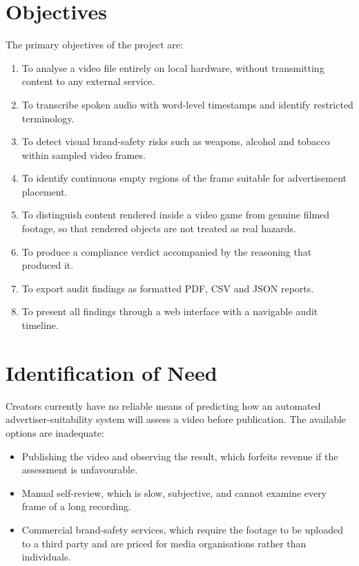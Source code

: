 \documentclass[12pt,a4paper,twoside]{report}
\begin{document}
\section{Objectives}

The primary objectives of the project are:

\begin{enumerate}
\item To analyse a video file entirely on local hardware, without transmitting content to any external service.
\item To transcribe spoken audio with word-level timestamps and identify restricted terminology.
\item To detect visual brand-safety risks such as weapons, alcohol and tobacco within sampled video frames.
\item To identify continuous empty regions of the frame suitable for advertisement placement.
\item To distinguish content rendered inside a video game from genuine filmed footage, so that rendered objects are not treated as real hazards.
\item To produce a compliance verdict accompanied by the reasoning that produced it.
\item To export audit findings as formatted PDF, CSV and JSON reports.
\item To present all findings through a web interface with a navigable audit timeline.
\end{enumerate}

\section{Identification of Need}

Creators currently have no reliable means of predicting how an automated advertiser-suitability system will assess a video before publication. The available options are inadequate:

\begin{itemize}
\item Publishing the video and observing the result, which forfeits revenue if the assessment is unfavourable.
\item Manual self-review, which is slow, subjective, and cannot examine every frame of a long recording.
\item Commercial brand-safety services, which require the footage to be uploaded to a third party and are priced for media organisations rather than individuals.
\end{itemize}
\end{document}
